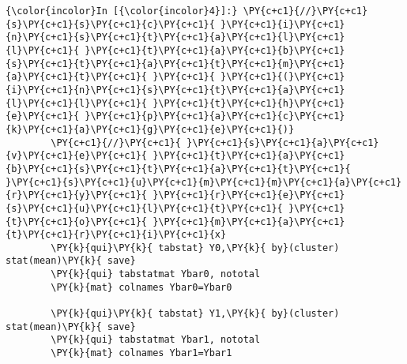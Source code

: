 \documentclass[11pt,notitlepage]{article}\usepackage[]{graphicx}\usepackage[]{color}
\makeatletter
\newenvironment{kframe}{%
 \def\at@end@of@kframe{}%
 \ifinner\ifhmode%
  \def\at@end@of@kframe{\end{minipage}}%
  \begin{minipage}{\columnwidth}%
 \fi\fi%
 \def\FrameCommand##1{\hskip\@totalleftmargin \hskip-\fboxsep
 \colorbox{shadecolor}{##1}\hskip-\fboxsep
     \hskip-\linewidth \hskip-\@totalleftmargin \hskip\columnwidth}%
 \MakeFramed {\advance\hsize-\width
   \@totalleftmargin\z@ \linewidth\hsize
   \@setminipage}}%
 {\par\unskip\endMakeFramed%
 \at@end@of@kframe}
\newenvironment{knitrout}{}{} %
\makeatother
\begin{document}
\begin{enumerate}[a)]
\begin{knitrout}
\begin{kframe}
    \begin{Verbatim}[commandchars=\\\{\}]
{\color{incolor}In [{\color{incolor}4}]:} \PY{c+c1}{//}\PY{c+c1}{s}\PY{c+c1}{s}\PY{c+c1}{c}\PY{c+c1}{ }\PY{c+c1}{i}\PY{c+c1}{n}\PY{c+c1}{s}\PY{c+c1}{t}\PY{c+c1}{a}\PY{c+c1}{l}\PY{c+c1}{l}\PY{c+c1}{ }\PY{c+c1}{t}\PY{c+c1}{a}\PY{c+c1}{b}\PY{c+c1}{s}\PY{c+c1}{t}\PY{c+c1}{a}\PY{c+c1}{t}\PY{c+c1}{m}\PY{c+c1}{a}\PY{c+c1}{t}\PY{c+c1}{ }\PY{c+c1}{ }\PY{c+c1}{(}\PY{c+c1}{i}\PY{c+c1}{n}\PY{c+c1}{s}\PY{c+c1}{t}\PY{c+c1}{a}\PY{c+c1}{l}\PY{c+c1}{l}\PY{c+c1}{ }\PY{c+c1}{t}\PY{c+c1}{h}\PY{c+c1}{e}\PY{c+c1}{ }\PY{c+c1}{p}\PY{c+c1}{a}\PY{c+c1}{c}\PY{c+c1}{k}\PY{c+c1}{a}\PY{c+c1}{g}\PY{c+c1}{e}\PY{c+c1}{)}
        \PY{c+c1}{//}\PY{c+c1}{ }\PY{c+c1}{s}\PY{c+c1}{a}\PY{c+c1}{v}\PY{c+c1}{e}\PY{c+c1}{ }\PY{c+c1}{t}\PY{c+c1}{a}\PY{c+c1}{b}\PY{c+c1}{s}\PY{c+c1}{t}\PY{c+c1}{a}\PY{c+c1}{t}\PY{c+c1}{ }\PY{c+c1}{s}\PY{c+c1}{u}\PY{c+c1}{m}\PY{c+c1}{m}\PY{c+c1}{a}\PY{c+c1}{r}\PY{c+c1}{y}\PY{c+c1}{ }\PY{c+c1}{r}\PY{c+c1}{e}\PY{c+c1}{s}\PY{c+c1}{u}\PY{c+c1}{l}\PY{c+c1}{t}\PY{c+c1}{ }\PY{c+c1}{t}\PY{c+c1}{o}\PY{c+c1}{ }\PY{c+c1}{m}\PY{c+c1}{a}\PY{c+c1}{t}\PY{c+c1}{r}\PY{c+c1}{i}\PY{c+c1}{x}
        \PY{k}{qui}\PY{k}{ tabstat} Y0,\PY{k}{ by}(cluster) stat(mean)\PY{k}{ save}
        \PY{k}{qui} tabstatmat Ybar0, nototal
        \PY{k}{mat} colnames Ybar0=Ybar0
        
        \PY{k}{qui}\PY{k}{ tabstat} Y1,\PY{k}{ by}(cluster) stat(mean)\PY{k}{ save}
        \PY{k}{qui} tabstatmat Ybar1, nototal
        \PY{k}{mat} colnames Ybar1=Ybar1
\end{Verbatim}


\end{kframe}
\end{knitrout}
\end{enumerate}
\end{document}
